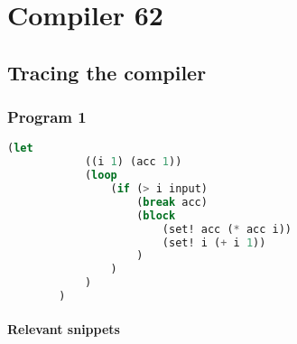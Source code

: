 
	\chapter*{Compiler 62}

	\section{Tracing the compiler}

	\subsection{Program 1}

	\begin{lstlisting}[title=Factorial Program, language=Lisp]
		(let
			((i 1) (acc 1))
			(loop
				(if (> i input)
					(break acc)
					(block
						(set! acc (* acc i))
						(set! i (+ i 1))
					)
				)
			)
		)
	\end{lstlisting}

	\subsubsection{Relevant snippets}

